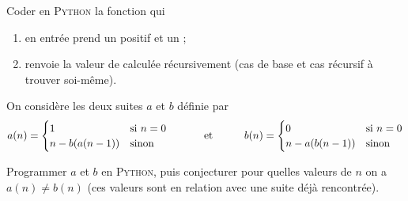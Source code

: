 \documentclass[a4paper,12pt,french]{article}
\begin{document}
\begin{exercice}
	Coder en \textsc{Python} la fonction  qui
	\begin{enumerate}[--]
		\item 	en entrée prend un  positif  et un ;
		\item 	renvoie la valeur de  calculée récursivement (cas de base et cas récursif à trouver soi-même).\end{enumerate}
\end{exercice}


\begin{exercice}
	On considère les deux suites $a$ et $b$ définie par
	$$a(n)=\begin{cases}
	1 & \mbox{si } n=0\\
	n-b(a(n-1)) &\mbox{sinon}
	\end{cases}
	\mbox{\hspace{3em} et\hspace{3em}}
	b(n)=\begin{cases}
	0 & \mbox{si } n=0\\
	n-a(b(n-1)) &\mbox{sinon}
	\end{cases}$$

	Programmer $a$ et $b$ en \textsc{Python}, puis conjecturer pour quelles valeurs de $n$ on a $a(n)\neq b(n)$ (ces valeurs sont en relation avec une suite déjà rencontrée).
\end{exercice}
\end{document}
